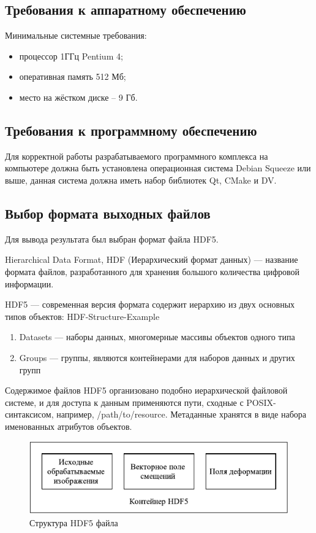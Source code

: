 \subsection {Требования к аппаратному обеспечению}
Минимальные системные требования:

\begin{itemize}
\item процессор 1ГГц Pentium 4;
\item оперативная память 512 Мб;
\item место на жёстком диске -- 9 Гб.
\end{itemize}

\subsection {Требования к программному обеспечению}
Для корректной работы разрабатываемого программного комплекса на компьютере должна быть установлена операционная система Debian Squeeze или выше, данная система должна иметь набор библиотек Qt, CMake и DV.

\subsection {Выбор формата выходных файлов}
Для вывода результата был выбран формат файла HDF5. 

Hierarchical Data Format, HDF (Иерархический формат данных) — название формата файлов, разработанного для хранения большого количества цифровой информации.

HDF5 — современная версия формата содержит иерархию из двух основных типов объектов:
HDF-Structure-Example
\begin{enumerate}
\item Datasets — наборы данных, многомерные массивы объектов одного типа
\item Groups — группы, являются контейнерами для наборов данных и других групп
\end{enumerate}
    
Содержимое файлов HDF5 организовано подобно иерархической файловой системе, и для доступа к данным применяются пути, сходные с POSIX-синтаксисом, например, /path/to/resource. Метаданные хранятся в виде набора именованных атрибутов объектов.\cite{hdf5}
\begin{figure}
\centering
\includegraphics[width=0.7\linewidth]{images/structHDF5}
\caption{Структура HDF5 файла}
\label{fig:structHDF5}
\end{figure}

